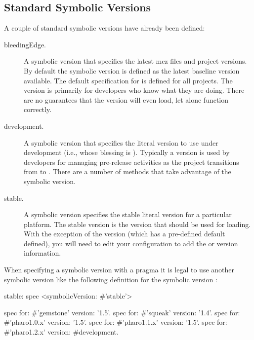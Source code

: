 \documentclass[a4paper,10pt,twoside]{book}
\begin{document}
\subsection{Standard Symbolic Versions}

A couple of standard symbolic versions have already been defined:

\begin{description}
\item [bleedingEdge.]  A symbolic version that specifies the latest mcz files and project versions. By default the  symbolic version is defined as the latest baseline version available. The default specification for  is defined for all projects. The  version is primarily for developers who know what they are doing. There are no guarantees that the  version will even load, let alone function correctly.

\item [development.] A symbolic version that specifies the literal version to use under development (i.e., whose blessing is ). Typically a  version is used by developers for managing pre-release activities as the project transitions from  to . There are a number of  methods that take advantage of the  symbolic version.

\item [stable.] A symbolic version specifies the stable literal version for a particular platform. The stable version is the version that should be used for loading.
With the exception of the  version (which has a pre-defined default defined), you will need to edit your configuration to add the  or  version information.
\end{description}



When specifying a symbolic version with a  pragma it is legal to use another symbolic version like the following definition for the symbolic version :

\begin{code}{}
stable: spec
	<symbolicVersion: #'stable'>

	spec for: #'gemstone' version: '1.5'.
	spec for: #'squeak' version: '1.4'.
	spec for: #'pharo1.0.x' version: '1.5'.
	spec for: #'pharo1.1.x' version: '1.5'.
	spec for: #'pharo1.2.x' version: #development.
\end{code}
\end{document}
